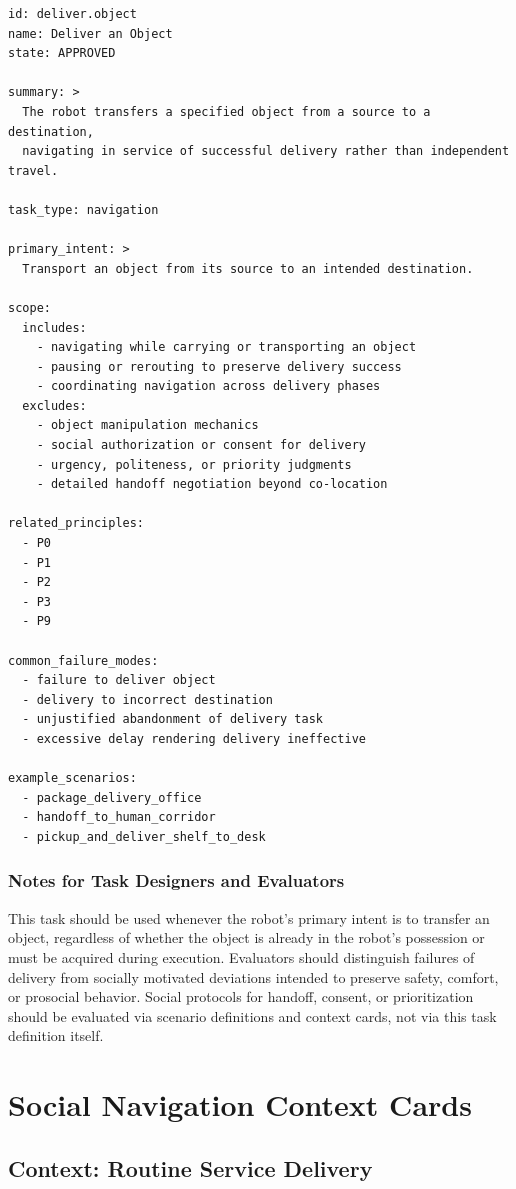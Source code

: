 \documentclass[utf8]{frontiers_suppmat} %
\begin{document}
\begin{lstlisting}[style=literatecard]
id: deliver.object
name: Deliver an Object
state: APPROVED

summary: >
  The robot transfers a specified object from a source to a destination,
  navigating in service of successful delivery rather than independent travel.

task_type: navigation

primary_intent: >
  Transport an object from its source to an intended destination.

scope:
  includes:
    - navigating while carrying or transporting an object
    - pausing or rerouting to preserve delivery success
    - coordinating navigation across delivery phases
  excludes:
    - object manipulation mechanics
    - social authorization or consent for delivery
    - urgency, politeness, or priority judgments
    - detailed handoff negotiation beyond co-location

related_principles:
  - P0
  - P1
  - P2
  - P3
  - P9

common_failure_modes:
  - failure to deliver object
  - delivery to incorrect destination
  - unjustified abandonment of delivery task
  - excessive delay rendering delivery ineffective

example_scenarios:
  - package_delivery_office
  - handoff_to_human_corridor
  - pickup_and_deliver_shelf_to_desk
\end{lstlisting}

\subsubsection{Notes for Task Designers and
Evaluators}\label{notes-for-task-designers-and-evaluators}

This task should be used whenever the robot's primary intent is to
transfer an object, regardless of whether the object is already in the
robot's possession or must be acquired during execution. Evaluators
should distinguish failures of delivery from socially motivated
deviations intended to preserve safety, comfort, or prosocial behavior.
Social protocols for handoff, consent, or prioritization should be
evaluated via scenario definitions and context cards, not via this task
definition itself.


\section{Social Navigation Context Cards}
\subsection{Context: Routine Service
Delivery}\label{context-routine-service-delivery}
\end{document}
